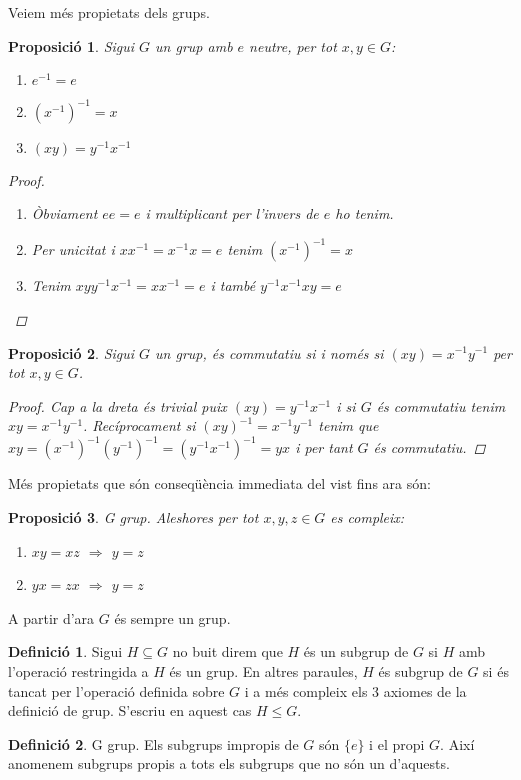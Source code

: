 \documentclass[a4paper,11pt]{report}
\newcommand{\inv}[1]{#1^{-1}}
\theoremstyle{theorem}
\newtheorem{proposicio}{\normalfont \sffamily\bfseries Proposició}[section]
\theoremstyle{definition}
\newtheorem{definicio}{\normalfont\sffamily\bfseries Definició}[section]
\begin{document}
Veiem més propietats dels grups.
\begin{proposicio} Sigui $G$ un grup amb $e$ neutre, per tot $x,y\in G$:
	\begin{enumerate}
		\item $e^{-1}=e$
		\item $(x^{-1})^{-1}=x$
		\item $(x y)=y^{-1} x^{-1}$
	\end{enumerate}
\begin{proof}
	\begin{enumerate}
	\item Òbviament $ee=e$ i multiplicant per l'invers de $e$ ho tenim.
	\item Per unicitat i $xx^{-1}=x^{-1} x=e$ tenim $(x^{-1})^{-1}=x$
	\item Tenim $xy y^{-1} x^{-1}=xx^{-1}=e$ i també $y^{-1} x^{-1}xy=e$
		\end{enumerate}
\end{proof}
\end{proposicio}
\begin{proposicio}
	Sigui $G$ un grup, és commutatiu si i només si $(xy)=x^{-1}y^{-1}$ per tot $x,y\in G$.
	\begin{proof}
		Cap a la dreta és trivial puix $(xy)=y^{-1}x^{-1}$ i si $G$ és commutatiu tenim $xy=x^{-1}y^{-1}$.
		Recíprocament si $\inv{(xy)}=\inv{x}\inv{y}$ tenim que $xy=\inv{(\inv{x})}\inv{(\inv{y})}=\inv{(\inv{y}\inv{x})}=yx$ i per tant $G$ és commutatiu.
	\end{proof}
\end{proposicio}
Més propietats que són conseqüència immediata del vist fins ara són:
\begin{proposicio}
	G grup. Aleshores per tot $x,y,z\in G$ es compleix:
	\begin{enumerate}
		\item $xy=xz$ $\Rightarrow$ $y=z$
		\item $yx=zx$ $ \Rightarrow$ $y=z$
	\end{enumerate}
\end{proposicio}
A partir d'ara $G$ és sempre un grup.
\begin{definicio}
	Sigui $H\subseteq G$ no buit direm que $H$ és un subgrup de $G$ si $H$ amb l'operació restringida a $H$ és un grup. En altres paraules, $H$ és subgrup de $G$ si és tancat per l'operació definida sobre $G$ i a més compleix els 3 axiomes de la definició de grup. S'escriu en aquest cas $H\leq G$.
\end{definicio}
\begin{definicio}
	G grup. Els subgrups impropis de $G$ són $\{e\}$ i el propi $G$. Així anomenem subgrups propis a tots els subgrups que no són un d'aquests.
\end{definicio}
\end{document}
